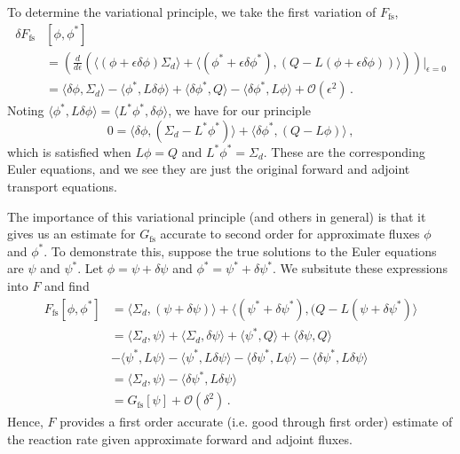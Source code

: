 To determine the variational principle, we take the first variation 
of $F_{\text{fs}}$,
\begin{equation}
 \begin{split}
  \delta F_{\text{fs}} & [\phi,\phi^*] \\
   &= \left ( \frac{d}{d\epsilon} 
            \left ( \langle (\phi+\epsilon \delta \phi) \Sigma_d \rangle + 
                    \langle (\phi^* + \epsilon \delta \phi^*), 
                            (Q-L(\phi+\epsilon \delta \phi)) \rangle 
            \right ) 
    \right ) \Bigg|_{\epsilon=0} \\
   &= \langle \delta \phi, \Sigma_d \rangle - 
      \langle \phi^*,L \delta \phi \rangle + 
      \langle \delta \phi^*, Q \rangle - 
      \langle \delta \phi^*, L \phi \rangle +
      \mathcal{O}(\epsilon^2) \, .
 \end{split}
\end{equation}
Noting 
$\langle \phi^*,L\delta \phi \rangle = \langle L^* \phi^*,\delta \phi \rangle$, 
we have for our principle 
\begin{equation}
 0 = \langle \delta \phi, (\Sigma_d - L^* \phi^*) \rangle + 
     \langle \delta \phi^*, (Q-L\phi) \rangle \, ,
\end{equation}
which is satisfied when $L\phi = Q$ and $L^* \phi^* = \Sigma_d$.  These are 
the corresponding Euler equations, and we see they are just the original 
forward and adjoint transport equations.

The importance of this variational principle (and others in general) is that 
it gives us an estimate for $G_{\text{fs}}$ accurate to second order for 
approximate fluxes $\phi$ and $\phi^*$.  To demonstrate this, suppose the 
true solutions to the Euler equations are $\psi$ and $\psi^*$.  
Let $\phi = \psi + \delta \psi$ and $\phi^* = \psi^* + \delta \psi^*$.  
We subsitute these expressions into $F$ and find
\begin{equation}
 \begin{split}
    F_{\text{fs}} [\phi,\phi^*] &= 
      \langle \Sigma_d, (\psi+\delta \psi) \rangle + 
      \langle (\psi^*+\delta \psi^*),(Q-L(\psi+\delta \psi^*) \rangle \\
    &= \langle \Sigma_d,\psi \rangle + 
       \langle \Sigma_d, \delta \psi \rangle + 
       \langle \psi^*,Q \rangle + 
       \langle \delta \psi,Q \rangle  \\ 
    &- \langle \psi^*, L\psi \rangle - 
       \langle \psi^*, L\delta \psi \rangle - 
       \langle \delta \psi^*, L\psi \rangle - 
       \langle \delta \psi^*, L\delta \psi \rangle \\
    &= \langle \Sigma_d, \psi \rangle - 
       \langle \delta \psi^*, L\delta \psi \rangle \\
    &= G_{\text{fs}}[\psi] + \mathcal{O}(\delta^2) \, .
 \end{split}
 \label{eq:secondorderfs}
\end{equation}
Hence, $F$ provides a first order accurate (i.e. good through first order) 
estimate of the reaction rate given approximate forward and adjoint fluxes.

